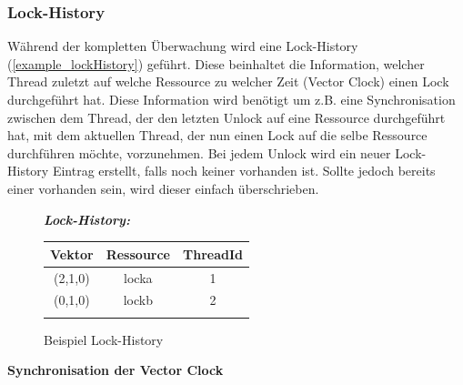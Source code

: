\documentclass[10pt,a4paper]{article}
\begin{document}
\subsubsection{Lock-History}\label{lock_history}
\begin{flushleft}
Während der kompletten Überwachung wird eine Lock-History (\autoref{example_lockHistory}) geführt. Diese beinhaltet die Information, welcher Thread zuletzt auf welche Ressource zu welcher Zeit (Vector Clock) einen Lock durchgeführt hat. Diese Information wird benötigt um z.B. eine Synchronisation zwischen dem Thread, der den letzten Unlock auf eine Ressource durchgeführt hat, mit dem aktuellen Thread, der nun einen Lock auf die selbe Ressource durchführen möchte, vorzunehmen. Bei jedem Unlock wird ein neuer Lock-History Eintrag erstellt, falls noch keiner vorhanden ist. Sollte jedoch bereits einer vorhanden sein, wird dieser einfach überschrieben.\\
\end{flushleft}
\begin{figure}[H]
\begin{center}
\textbf{\textit{Lock-History:}}\\[0.5cm]
\begin{tabular}{ c c c }
  Vektor & Ressource & ThreadId \\\hline
  (2,1,0) & locka & 1 \\
  (0,1,0) & lockb & 2 \\\hline\\
\end{tabular}
\caption{Beispiel Lock-History}\label{example_lockHistory}
\end{center}
\end{figure}
\textbf{Synchronisation der Vector Clock}
\end{document}
